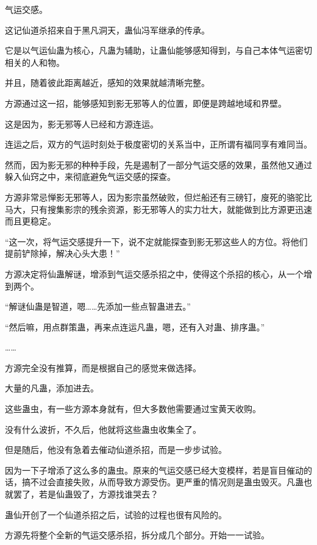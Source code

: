 
\begin{this_body}



气运交感。

这记仙道杀招来自于黑凡洞天，蛊仙冯军继承的传承。

它是以气运仙蛊为核心，凡蛊为辅助，让蛊仙能够感知得到，与自己本体气运密切相关的人和物。

并且，随着彼此距离越近，感知的效果就越清晰完整。

方源通过这一招，能够感知到影无邪等人的位置，即便是跨越地域和界壁。

这是因为，影无邪等人已经和方源连运。

连运之后，双方的气运时刻处于极度密切的关系当中，正所谓有福同享有难同当。

然而，因为影无邪的种种手段，先是遏制了一部分气运交感的效果，虽然他又通过躲入仙窍之中，来彻底避免气运交感的探查。

方源非常忌惮影无邪等人，因为影宗虽然破败，但烂船还有三磅钉，廋死的骆驼比马大，只有搜集影宗的残余资源，影无邪等人的实力壮大，就能做到比方源更迅速而且更稳定。

“这一次，将气运交感提升一下，说不定就能探查到影无邪这些人的方位。将他们提前铲除掉，解决心头大患！”

方源决定将仙蛊解谜，增添到气运交感杀招之中，使得这个杀招的核心，从一个增到两个。

“解谜仙蛊是智道，嗯……先添加一些点智蛊进去。”

“然后嘛，用点群策蛊，再来点连运凡蛊，嗯，还有入对蛊、排序蛊。”

……

方源完全没有推算，而是根据自己的感觉来做选择。

大量的凡蛊，添加进去。

这些蛊虫，有一些方源本身就有，但大多数他需要通过宝黄天收购。

没有什么波折，不久后，他就将这些蛊虫收集全了。

但是随后，他没有急着去催动仙道杀招，而是一步步试验。

因为一下子增添了这么多的蛊虫。原来的气运交感已经大变模样，若是盲目催动的话，搞不过会直接失败，从而导致方源受伤。更严重的情况则是蛊虫毁灭。凡蛊也就罢了，若是仙蛊毁了，方源找谁哭去？

蛊仙开创了一个仙道杀招之后，试验的过程也很有风险的。

方源先将整个全新的气运交感杀招，拆分成几个部分。开始一一试验。


\end{this_body}
